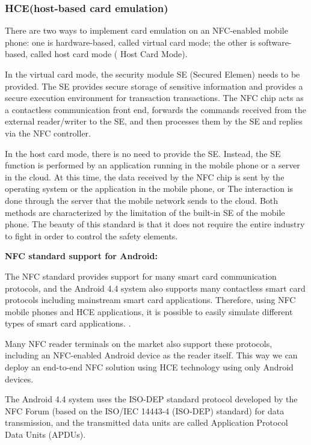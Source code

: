 \documentclass[journal]{IEEEtran}
\begin{document}
\subsubsection{HCE(host-based card emulation)}

There are two ways to implement card emulation on an NFC-enabled mobile phone: one is hardware-based, called virtual card mode; the other is software-based, called host card mode ( Host Card Mode).

In the virtual card mode, the security module SE (Secured Elemen) needs to be provided. The SE provides secure storage of sensitive information and provides a secure execution environment for transaction transactions. The NFC chip acts as a contactless communication front end, forwards the commands received from the external reader/writer to the SE, and then processes them by the SE and replies via the NFC controller.

In the host card mode, there is no need to provide the SE. Instead, the SE function is performed by an application running in the mobile phone or a server in the cloud. At this time, the data received by the NFC chip is sent by the operating system or the application in the mobile phone, or The interaction is done through the server that the mobile network sends to the cloud. Both methods are characterized by the limitation of the built-in SE of the mobile phone. The beauty of this standard is that it does not require the entire industry to fight in order to control the safety elements.

\textbf{NFC standard support for Android:}

The NFC standard provides support for many smart card communication protocols, and the Android 4.4 system also supports many contactless smart card protocols including mainstream smart card applications. Therefore, using NFC mobile phones and HCE applications, it is possible to easily simulate different types of smart card applications. .

Many NFC reader terminals on the market also support these protocols, including an NFC-enabled Android device as the reader itself. This way we can deploy an end-to-end NFC solution using HCE technology using only Android devices.

The Android 4.4 system uses the ISO-DEP standard protocol developed by the NFC Forum (based on the ISO/IEC 14443-4 (ISO-DEP) standard) for data transmission, and the transmitted data units are called Application Protocol Data Units (APDUs).
\end{document}
